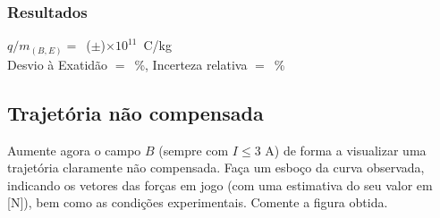 \documentclass[a4paper,12pt]{article}  %
\begin{document}

\subsubsection{\sf Resultados}
\noindent  $q/m_{(B,E)} =$~(\underline{\makebox[1.5cm][r]{~}}$\pm$\underline{\makebox[1cm][r]{~}})$\times 10^{11}\,$ C/kg  \\  

\noindent  Desvio à Exatidão $=$~\underline{\makebox[1cm][r]{~}}\%, 
Incerteza relativa $=$~\underline{\makebox[1cm][r]{~}}\% 

\subsection{\sf Trajetória não compensada}
Aumente agora o campo $B$ (sempre com $I\leq 3$ A) de forma a visualizar uma trajetória claramente não compensada.  Faça um esboço da curva observada, indicando os vetores das forças em jogo (com uma estimativa do seu valor em [N]), bem como as condições experimentais. Comente a figura obtida.
\begin{center}
\framebox[18cm]{\rule{0pt}{6.5cm}}
\end{center}
\end{document}
